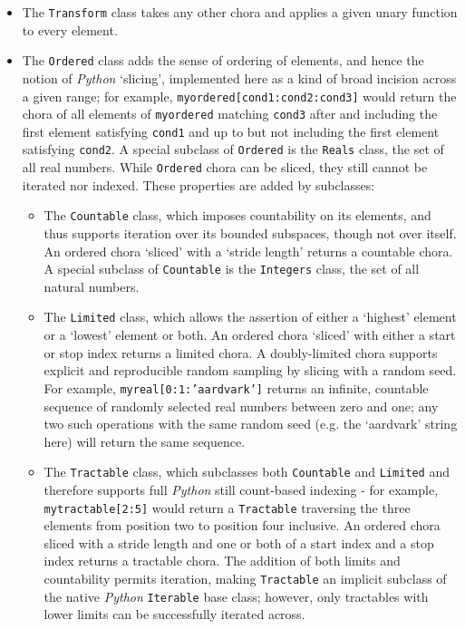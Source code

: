 \documentclass[a4paper,11pt,oneside]{book}
\begin{document}
\begin{itemize}
\item The \texttt{Transform} class takes any other chora and applies a given unary function to every element.
\item The \texttt{Ordered} class adds the sense of ordering of elements, and hence the notion of \textit{Python} `slicing', implemented here as a kind of broad incision across a given range; for example, \texttt{myordered[cond1:cond2:cond3]} would return the chora of all elements of \texttt{myordered} matching \texttt{cond3} after and including the first element satisfying \texttt{cond1} and up to but not including the first element satisfying \texttt{cond2}. A special subclass of \texttt{Ordered} is the \texttt{Reals} class, the set of all real numbers. While \texttt{Ordered} chora can be sliced, they still cannot be iterated nor indexed. These properties are added by subclasses:\begin{itemize}
\item The \texttt{Countable} class, which imposes countability on its elements, and thus supports iteration over its bounded subspaces, though not over itself. An ordered chora `sliced' with a `stride length' returns a countable chora. A special subclass of \texttt{Countable} is the \texttt{Integers} class, the set of all natural numbers.
\item The \texttt{Limited} class, which allows the assertion of either a `highest' element or a `lowest' element or both. An ordered chora `sliced' with either a start or stop index returns a limited chora. A doubly-limited chora supports explicit and reproducible random sampling by slicing with a random seed. For example, \texttt{myreal[0:1:'aardvark']} returns an infinite, countable sequence of randomly selected real numbers between zero and one; any two such operations with the same random seed (e.g. the `aardvark' string here) will return the same sequence.
\item The \texttt{Tractable} class, which subclasses both \texttt{Countable} and \texttt{Limited} and therefore supports full \textit{Python} still count-based indexing - for example, \texttt{mytractable[2:5]} would return a \texttt{Tractable} traversing the three elements from position two to position four inclusive. An ordered chora sliced with a stride length and one or both of a start index and a stop index returns a tractable chora. The addition of both limits and countability permits iteration, making \texttt{Tractable} an implicit subclass of the native \textit{Python} \texttt{Iterable} base class; however, only tractables with lower limits can be successfully iterated across.
\end{itemize}
\end{itemize}
\end{document}
